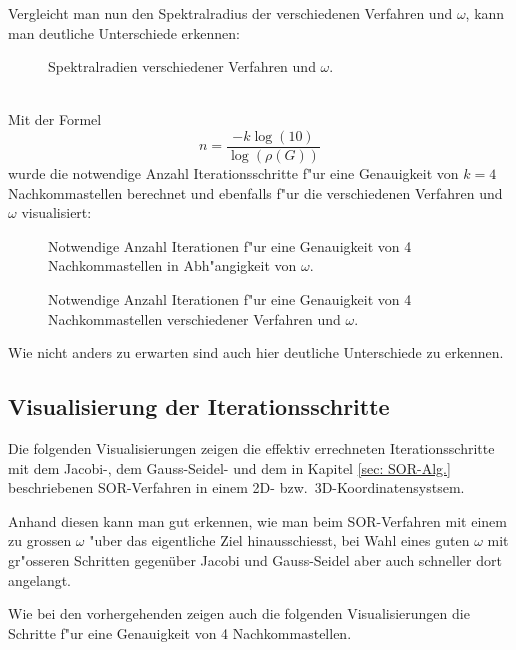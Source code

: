 \begin{refsection}
Vergleicht man nun den Spektralradius der verschiedenen Verfahren und $\omega$, kann man deutliche Unterschiede erkennen:
\begin{figure}[!ht]\centering
\caption{Spektralradien verschiedener Verfahren und $\omega$.}
\label{fig:Spekt.rad. Diagr.}
\end{figure}\\

Mit der Formel 
\begin{equation} \label{eq: Accuracy}
n=\frac{-k \log{(10)}}{\log{(\rho(G))}}
\end{equation}
wurde die notwendige Anzahl Iterationsschritte f"ur eine Genauigkeit von
$k=4$ Nachkommastellen berechnet und ebenfalls f"ur die verschiedenen
Verfahren und $\omega$ visualisiert:
\begin{figure}[!ht]\centering
\caption{Notwendige Anzahl Iterationen f"ur  eine Genauigkeit von 4 Nachkommastellen in Abh"angigkeit von $\omega$.}
\label{fig:Spekt.rad.vs.Anz.It.}
\end{figure}
\begin{figure}[!ht]\centering
\caption{Notwendige Anzahl Iterationen f"ur  eine Genauigkeit von 4 Nachkommastellen verschiedener Verfahren und $\omega$.}
\label{fig:It.vs.omega}
\end{figure}

Wie nicht anders zu erwarten sind auch hier deutliche Unterschiede zu erkennen.
		
\subsection{Visualisierung der Iterationsschritte}
Die folgenden Visualisierungen zeigen die effektiv errechneten
Iterationsschritte mit dem Jacobi-, dem Gauss-Seidel- und dem in
Kapitel \ref{sec: SOR-Alg.} beschriebenen SOR-Verfahren in einem 2D-
bzw.~3D-Koordinatensystsem.

Anhand diesen kann man gut erkennen, wie man beim SOR-Verfahren mit
einem zu grossen $\omega$ "uber das eigentliche Ziel hinausschiesst,
bei Wahl eines guten $\omega$ mit gr"osseren Schritten gegenüber Jacobi
und Gauss-Seidel aber auch schneller dort angelangt.

Wie bei den vorhergehenden zeigen auch die folgenden Visualisierungen
die Schritte f"ur eine Genauigkeit von 4 Nachkommastellen.
			

\end{refsection}
